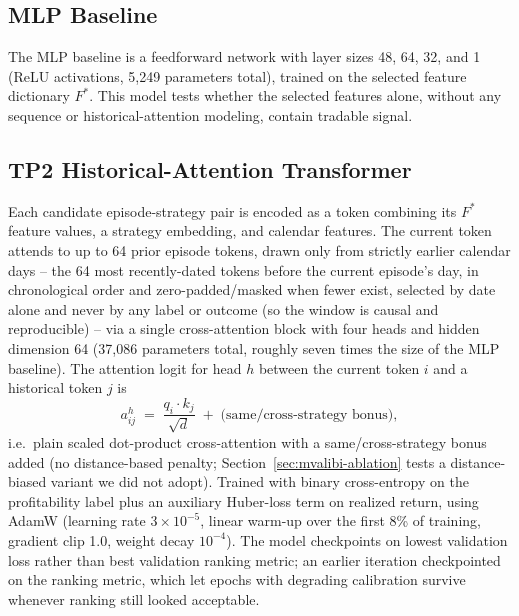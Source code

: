 \documentclass[sigconf,review]{acmart}
\begin{document}
\subsection{MLP Baseline}
The MLP baseline is a feedforward network with layer sizes 48, 64, 32, and 1 (ReLU activations, 5{,}249 parameters total), trained on the selected feature dictionary $F^{\ast}$. This model tests whether the selected features alone, without any sequence or historical-attention modeling, contain tradable signal.

\subsection{TP2 Historical-Attention Transformer}
\label{sec:transformer}
Each candidate episode-strategy pair is encoded as a token combining its $F^{\ast}$ feature values, a strategy embedding, and calendar features. The current token attends to up to 64 prior episode tokens, drawn only from strictly earlier calendar days -- the 64 most recently-dated tokens before the current episode's day, in chronological order and zero-padded/masked when fewer exist, selected by date alone and never by any label or outcome (so the window is causal and reproducible) -- via a single cross-attention block with four heads and hidden dimension 64 (37{,}086 parameters total, roughly seven times the size of the MLP baseline). The attention logit for head $h$ between the current token $i$ and a historical token $j$ is
\[
a_{ij}^{h} \;=\; \frac{q_i \cdot k_j}{\sqrt{d}} \;+\; \text{(same/cross-strategy bonus)},
\]
i.e.\ plain scaled dot-product cross-attention with a same/cross-strategy bonus added (no distance-based penalty; Section~\ref{sec:mvalibi-ablation} tests a distance-biased variant we did not adopt). Trained with binary cross-entropy on the profitability label plus an auxiliary Huber-loss term on realized return, using AdamW (learning rate $3\times10^{-5}$, linear warm-up over the first 8\% of training, gradient clip 1.0, weight decay $10^{-4}$). The model checkpoints on lowest validation loss rather than best validation ranking metric; an earlier iteration checkpointed on the ranking metric, which let epochs with degrading calibration survive whenever ranking still looked acceptable.
\end{document}
